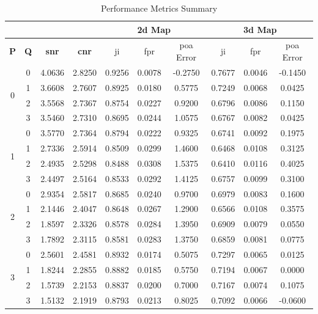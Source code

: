 \begin{table}[htbp!]
\centering
\caption{Performance Metrics Summary}
\begin{tabular}{cccccccccc}
\cline{5-10}
&&&& \multicolumn{3}{c}{\textbf{\gls{2d} Map}} & \multicolumn{3}{c}{\textbf{\gls{3d} Map}} \\ \hline
\textbf{P} & \textbf{Q} & \textbf{\gls{snr}} & \textbf{\gls{cnr}} & \gls{ji} & \gls{fpr} & \gls{poa} Error & \gls{ji} & \gls{fpr} & \gls{poa} Error \\ \hline
\multirow{4}{*}{0} & 0 & 4.0636 & 2.8250 & 0.9256 & 0.0078 & -0.2750 & 0.7677 & 0.0046 & -0.1450 \\
 & 1 & 3.6608 & 2.7607 & 0.8925 & 0.0180 & 0.5775 & 0.7249 & 0.0068 & 0.0425 \\
 & 2 & 3.5568 & 2.7367 & 0.8754 & 0.0227 & 0.9200 & 0.6796 & 0.0086 & 0.1150 \\
 & 3 & 3.5460 & 2.7310 & 0.8695 & 0.0244 & 1.0575 & 0.6767 & 0.0082 & 0.0425 \\ \hline
\multirow{4}{*}{1} & 0 & 3.5770 & 2.7364 & 0.8794 & 0.0222 & 0.9325 & 0.6741 & 0.0092 & 0.1975 \\
 & 1 & 2.7336 & 2.5914 & 0.8509 & 0.0299 & 1.4600 & 0.6468 & 0.0108 & 0.3125 \\
 & 2 & 2.4935 & 2.5298 & 0.8488 & 0.0308 & 1.5375 & 0.6410 & 0.0116 & 0.4025 \\
 & 3 & 2.4497 & 2.5164 & 0.8533 & 0.0292 & 1.4125 & 0.6757 & 0.0099 & 0.3100 \\ \hline
\multirow{4}{*}{2} & 0 & 2.9354 & 2.5817 & 0.8685 & 0.0240 & 0.9700 & 0.6979 & 0.0083 & 0.1600 \\
 & 1 & 2.1446 & 2.4047 & 0.8648 & 0.0267 & 1.2900 & 0.6566 & 0.0108 & 0.3575 \\
 & 2 & 1.8597 & 2.3326 & 0.8578 & 0.0284 & 1.3950 & 0.6909 & 0.0079 & 0.0550 \\
 & 3 & 1.7892 & 2.3115 & 0.8581 & 0.0283 & 1.3750 & 0.6859 & 0.0081 & 0.0775 \\ \hline
\multirow{4}{*}{3} & 0 & 2.5601 & 2.4581 & 0.8932 & 0.0174 & 0.5075 & 0.7297 & 0.0065 & 0.0125 \\
 & 1 & 1.8244 & 2.2855 & 0.8882 & 0.0185 & 0.5750 & 0.7194 & 0.0067 & 0.0000 \\
 & 2 & 1.5739 & 2.2153 & 0.8837 & 0.0200 & 0.7000 & 0.7167 & 0.0074 & 0.1075 \\
 & 3 & 1.5132 & 2.1919 & 0.8793 & 0.0213 & 0.8025 & 0.7092 & 0.0066 & -0.0600 \\ \hline
\end{tabular}
\label{tab:perfSum}
\end{table}